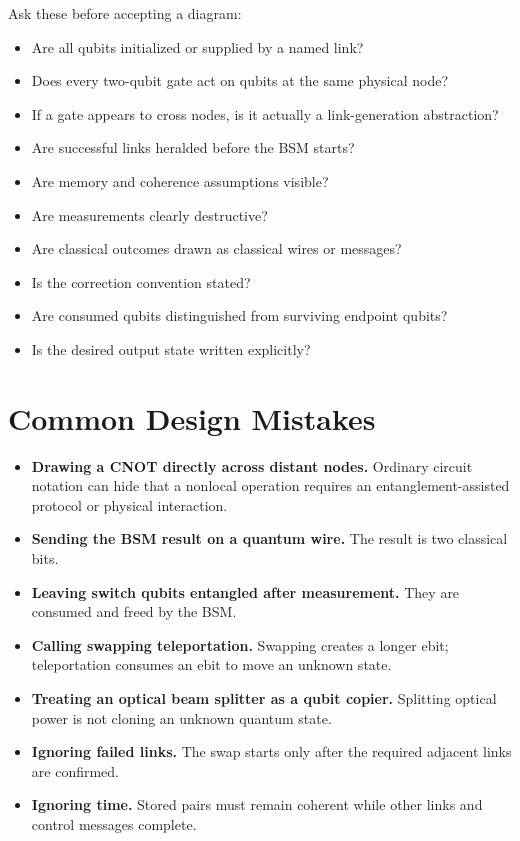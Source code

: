 \documentclass[11pt]{article}
\newcommand{\unchecked}{\(\square\)}
\begin{document}
Ask these before accepting a diagram:

\begin{itemize}[leftmargin=*]
    \item[\unchecked] Are all qubits initialized or supplied by a named link?
    \item[\unchecked] Does every two-qubit gate act on qubits at the same physical node?
    \item[\unchecked] If a gate appears to cross nodes, is it actually a link-generation abstraction?
    \item[\unchecked] Are successful links heralded before the BSM starts?
    \item[\unchecked] Are memory and coherence assumptions visible?
    \item[\unchecked] Are measurements clearly destructive?
    \item[\unchecked] Are classical outcomes drawn as classical wires or messages?
    \item[\unchecked] Is the correction convention stated?
    \item[\unchecked] Are consumed qubits distinguished from surviving endpoint qubits?
    \item[\unchecked] Is the desired output state written explicitly?
\end{itemize}

\section{Common Design Mistakes}

\begin{itemize}
    \item \textbf{Drawing a CNOT directly across distant nodes.} Ordinary circuit notation can hide that a nonlocal operation requires an entanglement-assisted protocol or physical interaction.
    \item \textbf{Sending the BSM result on a quantum wire.} The result is two classical bits.
    \item \textbf{Leaving switch qubits entangled after measurement.} They are consumed and freed by the BSM.
    \item \textbf{Calling swapping teleportation.} Swapping creates a longer ebit; teleportation consumes an ebit to move an unknown state.
    \item \textbf{Treating an optical beam splitter as a qubit copier.} Splitting optical power is not cloning an unknown quantum state.
    \item \textbf{Ignoring failed links.} The swap starts only after the required adjacent links are confirmed.
    \item \textbf{Ignoring time.} Stored pairs must remain coherent while other links and control messages complete.
\end{itemize}
\end{document}
